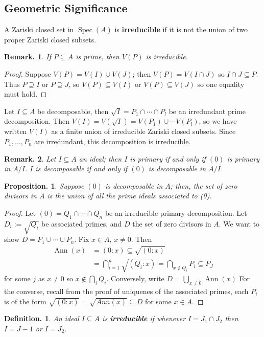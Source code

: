 \documentclass[11pt, a4paper]{memoir}
\theoremstyle{change}
\newtheorem{proposition}[theorem]{Proposition.}
\theoremstyle{plain}
\theoremstyle{nonumberplain}
\newtheorem{definition}{Definition.}
\newtheorem{remark}{Remark.}
\newtheorem{proof}{Proof}
\DeclareMathOperator{\Ann}{Ann}
\DeclareMathOperator{\Spec}{Spec}
\numberwithin{equation}{section}
\begin{document}
\subsection{Geometric Significance}
A Zariski closed set in $\Spec(A)$ is \textbf{irreducible} if it is not the union of two proper Zariski closed subsets.
\begin{remark}
    If $P\subseteq A$ is prime, then $V(P)$ is irreducible.
\end{remark}
\begin{proof}
    Suppose $V(P)=V(I)\cup V(J)$; then $V(P)=V(I\cap J)$ so $I\cap J\subseteq P$.
    Thus $P\supseteq I$ or $P\supseteq J$, so $V(P)\subseteq V(I)$ or $V(P)\subseteq V(J)$ so one equality must hold.
\end{proof}
Let $I\subseteq A$ be decomposable, then $\sqrt{I}=P_1\cap\cdots\cap P_l$ be an irredundant prime decomposition.
Then $V(I)=V(\sqrt{I})=V(P_1)\cup\cdots V(P_l)$, so we have written $V(I)$ as a finite union of irreducible Zariski closed subsets.
Since $P_1,\ldots,P_n$ are irredundant, this decomposition is irreducible.
\begin{remark}
    Let $I\subseteq A$ an ideal; then $I$ is primary if and only if $(0)$ is primary in $A/I$.
    $I$ is decomposable if and only if $(0)$ is decomposable in $A/I$.
\end{remark}
\begin{proposition}
    Suppose $(0)$ is decomposable in $A$; then, the set of zero divisors in $A$ is the union of all the prime ideals associated to (0).
\end{proposition}
\begin{proof}
    Let $(0)=Q_1\cap\cdots\cap Q_n$ be an irreducible primary decomposition.
    Let $D_i:=\sqrt{Q_i}$ be associated primes, and $D$ the set of zero divisors in $A$.
    We want to show $D=P_1\cup\cdots\cup P_n$.
    Fix $x\in A$, $x\neq 0$.
    Then
    \begin{align*}
        \Ann(x)&=(0:x)\subseteq\sqrt{(0:x)}\\
               &= \bigcap_{i=1}^n\sqrt{(Q_i:x)}=\bigcap_{x\notin Q_i} P_i\subseteq P_J
    \end{align*}
    for some $j$ as $x\neq 0$ so $x\notin\bigcap_i Q_i$.
    Conversely, write $D=\bigcup_{x\neq 0}\Ann(x)$
    For the converse, recall from the proof of uniquenes of the associated primes, each $P_i$ is of the form $\sqrt{(0:x)}=\sqrt{Ann(x)}\subseteq D$ for some $x\in A$.
\end{proof}
\begin{definition}
    An ideal $I\subseteq A$ is \textbf{irreducible} if whenever $I=J_1\cap J_2$ then $I=J-1$ or $I=J_2$.
\end{definition}
\end{document}
